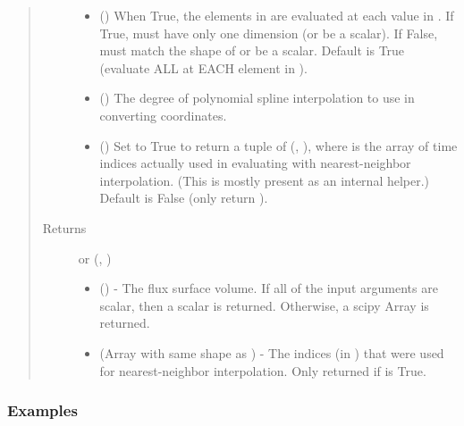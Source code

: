 \documentclass[letterpaper,10pt,english]{sphinxmanual}
\begin{document}
\begin{fulllineitems}
\begin{fulllineitems}
\begin{quote}
\begin{description}
\begin{itemize}
\item {} 
 () \textendash{} When True, the elements in  are evaluated
at each value in . If True,  must have only one dimension
(or be a scalar). If False,  must match the shape of 
or be a scalar. Default is True (evaluate ALL  at EACH
element in ).

\item {} 
 () \textendash{} The degree of polynomial spline interpolation to
use in converting coordinates.

\item {} 
 () \textendash{} Set to True to return a tuple of (,
), where  is the array of time indices
actually used in evaluating  with nearest-neighbor
interpolation. (This is mostly present as an internal helper.)
Default is False (only return ).

\end{itemize}

\item[{Returns}] \leavevmode

 or (, )
\begin{itemize}
\item {} 
 () - The flux surface volume. If
all of the input arguments are scalar, then a scalar is returned.
Otherwise, a scipy Array is returned.

\item {} 
 (Array with same shape as ) - The indices
(in ) that were used for
nearest-neighbor interpolation. Only returned if  is
True.

\end{itemize}


\end{description}\end{quote}
\subsubsection*{Examples}


\end{fulllineitems}
\end{fulllineitems}
\end{document}
